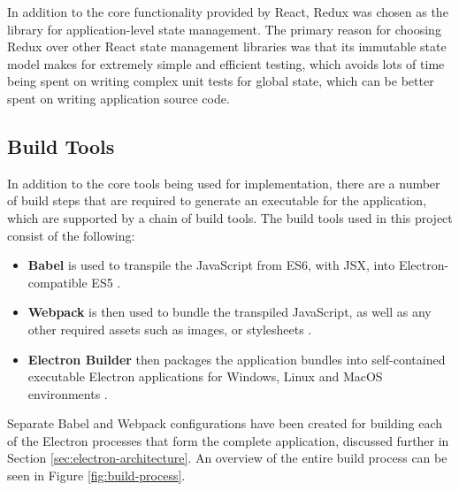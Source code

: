 In addition to the core functionality provided by React, Redux \cite{redux} was chosen as the library for application-level state management. The primary reason for choosing Redux over other React state management libraries was that its immutable state model makes for extremely simple and efficient testing, which avoids lots of time being spent on writing complex unit tests for global state, which can be better spent on writing application source code.

\subsection{Build Tools}
In addition to the core tools being used for implementation, there are a number of build steps that are required to generate an executable for the application, which are supported by a chain of build tools. The build tools used in this project consist of the following:

\begin{itemize}
  \item \textbf{Babel} is used to transpile the JavaScript from ES6, with JSX, into Electron-compatible ES5 \cite{babel}.
  \item \textbf{Webpack} is then used to bundle the transpiled JavaScript, as well as any other required assets such as images, or stylesheets \cite{webpack}.
  \item \textbf{Electron Builder} then packages the application bundles into self-contained executable Electron applications for Windows, Linux and MacOS environments \cite{electron-builder}.
\end{itemize}

Separate Babel and Webpack configurations have been created for building each of the Electron processes that form the complete application, discussed further in Section \ref{sec:electron-architecture}. An overview of the entire build process can be seen in Figure \ref{fig:build-process}.

